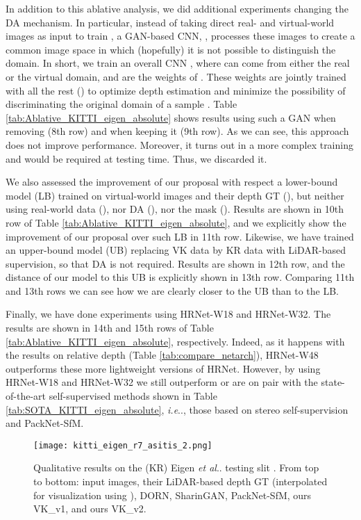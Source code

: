 \documentclass[journal]{IEEEtran}
\makeatletter
\DeclareRobustCommand\onedot{\futurelet\@let@token\@onedot}
\def\@onedot{\ifx\@let@token.\else.\null\fi\xspace}
\def\ie{\emph{i.e}\onedot} \def\Ie{\emph{I.e}\onedot}
\def\etal{\emph{et al}\onedot}
\newcommand{\Tab}[1]{Table \ref{tab:#1}}
\makeatother
\begin{document}
In addition to this ablative analysis, we did additional experiments changing the DA mechanism. In particular, instead of taking direct real- and virtual-world images as input to train , a GAN-based CNN, , processes these images to create a common image space in which (hopefully) it is not possible to distinguish the domain. In short, we train an overall CNN , where  can come from either the real or the virtual domain, and  are the weights of . These weights are jointly trained with all the rest () to optimize depth estimation and minimize the possibility of discriminating the original domain of a sample . Table \ref{tab:Ablative_KITTI_eigen_absolute} shows results using such a GAN when removing  (8th row) and when keeping it (9th row). As we can see, this approach does not improve performance. Moreover, it turns out in a more complex training and  would be required at testing time. Thus, we discarded it.

We also assessed the improvement of our proposal with respect a lower-bound model (LB) trained on virtual-world images and their depth GT (), but neither using real-world data (), nor DA (), nor the mask (). Results are shown in 10th row of \Tab{Ablative_KITTI_eigen_absolute}, and we explicitly show the improvement of our proposal over such LB in 11th row. Likewise, we have trained an upper-bound model (UB) replacing VK data by KR data with LiDAR-based supervision, so that DA is not required. Results are shown in 12th row, and the distance of our model to this UB is explicitly shown in 13th row. Comparing 11th and 13th rows we can see how we are clearly closer to the UB than to the LB. 

Finally, we have done experiments using HRNet-W18 and HRNet-W32. The results are shown in 14th and 15th rows of \Tab{Ablative_KITTI_eigen_absolute}, respectively. Indeed, as it happens with the results on relative depth (\Tab{compare_netarch}), HRNet-W48 outperforms these more lightweight versions of HRNet. However, by using HRNet-W18 and HRNet-W32 we still outperform or are on pair with the state-of-the-art self-supervised methods shown in \Tab{SOTA_KITTI_eigen_absolute}, {\ie}, those based on stereo self-supervision and PackNet-SfM.

\begin{figure*}
    \centering
    \texttt{[image: kitti\_eigen\_r7\_asitis\_2.png]}
    \caption{Qualitative results on the (KR) Eigen {\etal} testing slit \cite{Eigen:2014}. From top  to bottom: input images, their LiDAR-based depth GT (interpolated for visualization using \cite{Premebida:2014}), DORN, SharinGAN, PackNet-SfM, ours VK\_v1, and ours VK\_v2.}
    \label{fig:kitti_eigen_qualitative}
\end{figure*}
\end{document}
